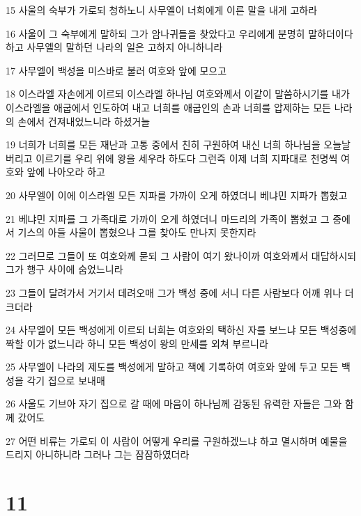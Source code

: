 \par 15 사울의 숙부가 가로되 청하노니 사무엘이 너희에게 이른 말을 내게 고하라
\par 16 사울이 그 숙부에게 말하되 그가 암나귀들을 찾았다고 우리에게 분명히 말하더이다 하고 사무엘의 말하던 나라의 일은 고하지 아니하니라
\par 17 사무엘이 백성을 미스바로 불러 여호와 앞에 모으고
\par 18 이스라엘 자손에게 이르되 이스라엘 하나님 여호와께서 이같이 말씀하시기를 내가 이스라엘을 애굽에서 인도하여 내고 너희를 애굽인의 손과 너희를 압제하는 모든 나라의 손에서 건져내었느니라 하셨거늘
\par 19 너희가 너희를 모든 재난과 고통 중에서 친히 구원하여 내신 너희 하나님을 오늘날 버리고 이르기를 우리 위에 왕을 세우라 하도다 그런즉 이제 너희 지파대로 천명씩 여호와 앞에 나아오라 하고
\par 20 사무엘이 이에 이스라엘 모든 지파를 가까이 오게 하였더니 베냐민 지파가 뽑혔고
\par 21 베냐민 지파를 그 가족대로 가까이 오게 하였더니 마드리의 가족이 뽑혔고 그 중에서 기스의 아들 사울이 뽑혔으나 그를 찾아도 만나지 못한지라
\par 22 그러므로 그들이 또 여호와께 묻되 그 사람이 여기 왔나이까 여호와께서 대답하시되 그가 행구 사이에 숨었느니라
\par 23 그들이 달려가서 거기서 데려오매 그가 백성 중에 서니 다른 사람보다 어깨 위나 더 크더라
\par 24 사무엘이 모든 백성에게 이르되 너희는 여호와의 택하신 자를 보느냐 모든 백성중에 짝할 이가 없느니라 하니 모든 백성이 왕의 만세를 외쳐 부르니라
\par 25 사무엘이 나라의 제도를 백성에게 말하고 책에 기록하여 여호와 앞에 두고 모든 백성을 각기 집으로 보내매
\par 26 사울도 기브아 자기 집으로 갈 때에 마음이 하나님께 감동된 유력한 자들은 그와 함께 갔어도
\par 27 어떤 비류는 가로되 이 사람이 어떻게 우리를 구원하겠느냐 하고 멸시하며 예물을 드리지 아니하니라 그러나 그는 잠잠하였더라

\chapter{11}

